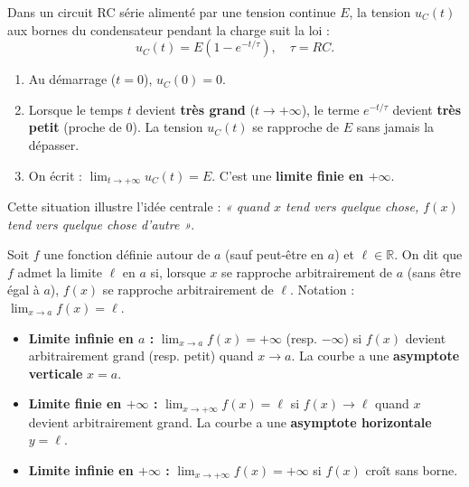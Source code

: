 \documentclass[11pt]{article}
\begin{document}
\begin{experience}
Dans un circuit RC série alimenté par une tension continue $E$, la tension $u_C(t)$ aux bornes du condensateur pendant la charge suit la loi :
\[
u_C(t) = E \left(1 - e^{-t/\tau}\right), \quad \tau = RC.
\]
\begin{enumerate}
    \item Au démarrage ($t=0$), $u_C(0) = 0$.
    \item Lorsque le temps $t$ devient \textbf{très grand} ($t \to +\infty$), le terme $e^{-t/\tau}$ devient \textbf{très petit} (proche de 0). La tension $u_C(t)$ se rapproche de $E$ sans jamais la dépasser.
    \item On écrit : $\lim_{t \to +\infty} u_C(t) = E$. C'est une \textbf{limite finie en $+\infty$}.
\end{enumerate}
Cette situation illustre l'idée centrale : \emph{« quand $x$ tend vers quelque chose, $f(x)$ tend vers quelque chose d'autre »}.
\end{experience}

\begin{definition}
Soit $f$ une fonction définie autour de $a$ (sauf peut-être en $a$) et $\ell \in \mathbb{R}$.
On dit que $f$ admet la limite $\ell$ en $a$ si, lorsque $x$ se rapproche arbitrairement de $a$ (sans être égal à $a$), $f(x)$ se rapproche arbitrairement de $\ell$.
Notation : $\lim_{x \to a} f(x) = \ell$.
\end{definition}

\begin{definition}
\begin{itemize}
    \item \textbf{Limite infinie en $a$ :} $\lim_{x \to a} f(x) = +\infty$ (resp. $-\infty$) si $f(x)$ devient arbitrairement grand (resp. petit) quand $x \to a$. La courbe a une \textbf{asymptote verticale} $x=a$.
    \item \textbf{Limite finie en $+\infty$ :} $\lim_{x \to +\infty} f(x) = \ell$ si $f(x) \to \ell$ quand $x$ devient arbitrairement grand. La courbe a une \textbf{asymptote horizontale} $y=\ell$.
    \item \textbf{Limite infinie en $+\infty$ :} $\lim_{x \to +\infty} f(x) = +\infty$ si $f(x)$ croît sans borne.
\end{itemize}
\end{definition}
\end{document}
